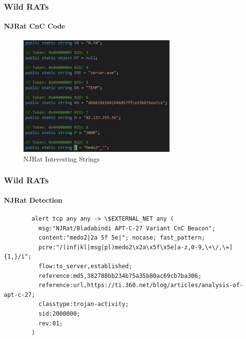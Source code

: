 \documentclass[aspectratio=169]{beamer}
\begin{document}
\begin{frame}
  \frametitle{Wild RATs}
  \framesubtitle{NJRat CnC Code}
  \begin{center}
    \begin{figure}
      \includegraphics[width=8cm,keepaspectratio]{njrat_strings}
      \caption{NJRat Interesting Strings}
    \end{figure}
  \end{center}
\end{frame}

\begin{frame}[fragile]{}
  \frametitle{Wild RATs}
  \framesubtitle{NJRat Detection}
  \begin{center}
    \begin{tcolorbox}[title=njrat.rules,colback=black]
    \begin{minipage}{0.5\textwidth}
      \begin{verbatim}
        alert tcp any any -> \$EXTERNAL_NET any (
          msg:"NJRat/Bladabindi APT-C-27 Variant CnC Beacon";
          content:"medo2|2a 5f 5e|"; nocase; fast_pattern;
          pcre:"/(inf|kl|msg|pl)medo2\x2a\x5f\x5e[a-z,0-9,\+\/,\=]{1,}/i";
          flow:to_server,established;
          reference:md5,382788bb234b75a35b80ac69cb7ba306;
          reference:url,https://ti.360.net/blog/articles/analysis-of-apt-c-27;
          classtype:trojan-activity;
          sid:2000000;
          rev:01;
        )
      \end{verbatim}
    \end{minipage}
    \end{tcolorbox}
  \end{center}
\end{frame}
\end{document}
